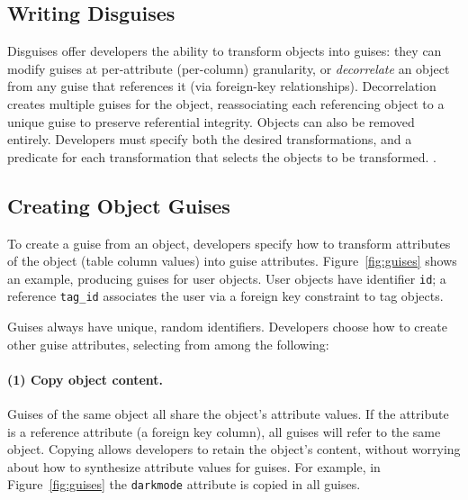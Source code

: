 \subsection{Writing Disguises}
Disguises offer developers the ability to transform objects into guises: they can modify
guises at per-attribute (\ie per-column) granularity, or \emph{decorrelate} an object from any guise that
references it (via \eg foreign-key relationships). Decorrelation creates multiple guises for the
object, reassociating each referencing object to a unique guise to preserve referential integrity.
Objects can also be removed entirely.
Developers must specify both the desired transformations, and a predicate for each transformation
that selects the objects to be transformed.
.

\subsection{Creating Object Guises}
\label{sec:guises}
%
To create a guise from an object, developers specify how to transform attributes of the
object (\eg table column values) into guise attributes.
%
Figure~\ref{fig:guises} shows an example, producing guises for user objects.
%
User objects have identifier \texttt{id}; a reference \texttt{tag\_id}
associates the user via a foreign key constraint to tag objects.
%

%
Guises always have unique, random identifiers.
%
Developers choose how to create other guise attributes, selecting from among the following:
%
\paragraph{(1) Copy object content.}
%
Guises of the same object all share the object's attribute values.
%
If the attribute is a reference attribute (\eg a foreign key column), all guises will refer to the same object.
%
%
Copying allows developers to retain the object's content, without worrying about how to
synthesize attribute values for guises.
%
For example, in Figure~\ref{fig:guises} the \texttt{darkmode} attribute is copied in
all guises.

